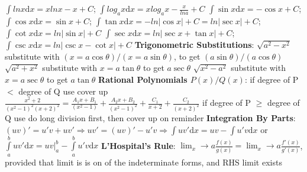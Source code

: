 \documentclass[twoside]{article}
\begin{document}
\indent $\int{lnx}\mathrm{d}x=xlnx-x+C$; $\int{log_a{x}\mathrm{d}x=x{log_a{x}}-\frac{x}{lna}+C}$\newline\newline
\indent $\int\sin{x}\mathrm{d}x=-\cos{x}+C$; $\int\cos{x}\mathrm{d}x=\sin{x}+C$; $\int\tan{x}\mathrm{d}x=-ln|\cos{x}|+C=ln|\sec{x}|+C$; $\int\cot{x}\mathrm{d}x=ln|\sin{x}|+C$\newline\newline
\indent $\int\sec{x}\mathrm{d}x=ln|\sec{x}+\tan{x}|+C$; $\int\csc{x}\mathrm{d}x=ln|\csc{x}-\cot{x}|+C$\newline\newline
\textbf{Trigonometric Substitutions}:\newline\newline
\indent $\sqrt{a^2-x^2}$ substitute with $(x=a\cos{\theta})/(x=a\sin\theta)$, to get $(a\sin\theta)/(a\cos\theta)$\newline\newline
\indent $\sqrt{a^2+x^2}$ substitute with $x=a\tan\theta$ to get $a\sec\theta$\newline\newline
\indent $\sqrt{x^2-a^2}$ substitute with $x=a\sec\theta$ to get $a\tan\theta$\newline\newline
\textbf{Rational Polynomials $P(x)/Q(x)$}:\newline
\indent if degree of P $<$ degree of Q use cover up\newline\newline
\indent\indent $\frac{x^2+2}{(x^2-1)^2(x+2)^2}=\frac{A_1x+B_1}{(x^2-1)}+\frac{A_2x+B_2}{(x^2-1)^2}+\frac{C_1}{x+2}+\frac{C_2}{(x+2)^2}$\newline\newline
\indent if degree of P $\geq$ degree of Q use do long division first, then cover up on reminder\newline\newline
\textbf{Integration By Parts}:\newline
\indent $(uv)'=u'v+uv' \Rightarrow uv'=(uv)'-u'v \Rightarrow \int{uv'}\mathrm{d}x=uv-\int{u'v}\mathrm{d}x$ or $\int\limits_a^b{uv'}\mathrm{d}x=\left.{uv}\right|_a^b-\int\limits_a^b{u'v}\mathrm{d}x$\newline
\textbf{L'Hospital's Rule}:\newline
\indent $\lim_x \to a \frac{f(x)}{g(x)} = \lim_x \to a \frac{f'(x)}{g'(x)}$, provided that limit is is on of the indeterminate forms, and RHS limit exists\newline
\end{document}
